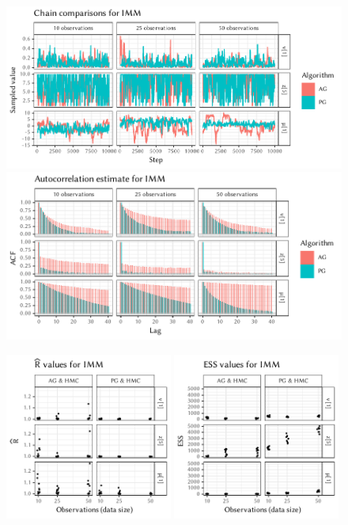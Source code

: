 \begin{figure}[p]
  \centering
  \includegraphics[width=\textwidth]{figures/IMM-chains}
  \par
  \includegraphics[width=\textwidth]{figures/IMM-acfs}
  \par
  \includegraphics[width=0.49\textwidth]{figures/IMM-rhat}
  \includegraphics[width=0.49\textwidth]{figures/IMM-ess}
\end{figure}

